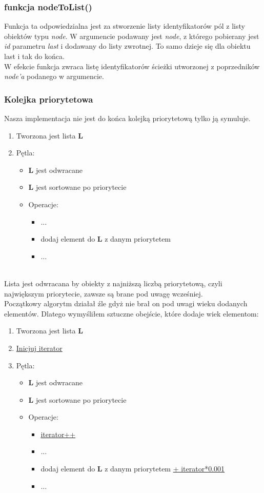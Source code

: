 \documentclass{article}
\begin{document}
\subsubsection{funkcja nodeToList()}
Funkcja ta odpowiedzialna jest za stworzenie listy identyfikatorów pól z listy obiektów typu \textit{node}. W argumencie podawany jest \textit{node}, z którego pobierany jest \textit{id} parametru \textit{last} i dodawany do listy zwrotnej. To samo dzieje się dla obiektu last i tak do końca. \\
W efekcie funkcja zwraca listę identyfikatorów ścieżki utworzonej z poprzedników \textit{node'a} podanego w argumencie.

\subsubsection{Kolejka priorytetowa}
Nasza implementacja nie jest do końca kolejką priorytetową tylko ją symuluje. \\
\begin{enumerate}
\item Tworzona jest lista \textbf{L}
\item Pętla:
	\begin{itemize}
	\item \textbf{L} jest odwracane
	\item \textbf{L} jest sortowane po priorytecie
	\item Operacje:
		\begin{itemize}
		\item ...
		\item dodaj element do \textbf{L} z danym priorytetem
		\item ...
		\end{itemize}				
	\end{itemize}
\end{enumerate}
\\
Lista jest odwracana by obiekty z najniższą liczbą priorytetową, czyli największym priorytecie, zawsze są brane pod uwagę wcześniej. \\
Początkowy algorytm działał źle gdyż nie brał on pod uwagi wieku dodanych elementów.
Dlatego wymyśliłem sztuczne obejście, które dodaje wiek elementom:
\begin{enumerate}
\item Tworzona jest lista \textbf{L}
\item \underline{Inicjuj iterator}
\item Pętla:
	\begin{itemize}
	\item \textbf{L} jest odwracane
	\item \textbf{L} jest sortowane po priorytecie
	\item Operacje:
		\begin{itemize}
		\item \underline{iterator++}
		\item ...
		\item dodaj element do \textbf{L} z danym priorytetem \underline{+ iterator*0.001}
		\item ...
		\end{itemize}				
	\end{itemize}
\end{enumerate}%
\end{document}
